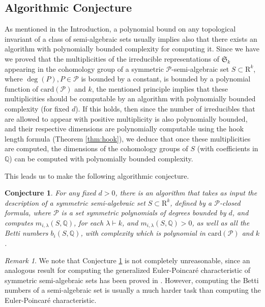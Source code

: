 \documentclass{amsart}
\newtheorem{conjecture}{Conjecture}
\theoremstyle{definition}
\theoremstyle{remark}
\newtheorem{remark}{Remark}
\numberwithin{equation}{section}
\begin{document}
\subsection{Algorithmic Conjecture}
As mentioned in the Introduction, a polynomial bound on any topological invariant
of a class of semi-algebraic sets usually implies also that there exists an algorithm with polynomially bounded
complexity for computing it. 
Since we have we proved that the multiplicities of the irreducible representations of 
$\mathfrak{S}_k$ appearing in the cohomology group  of a symmetric $\mathcal{P}$-semi-algebraic set $S \subset {\mathrm{R}}^k$, where $\deg(P), P \in \mathcal{P}$ is bounded by a constant, is bounded 
by a polynomial function of ${\mathrm{card}}(\mathcal{P})$ and $k$, the mentioned  principle implies that these multiplicities 
should be computable by an algorithm with polynomially bounded complexity (for fixed $d$).
If this holds, then since the number of irreducibles
that are allowed to appear with positive multiplicity is also polynomially bounded, and
their respective dimensions are polynomially computable using the hook length formula (Theorem 
\ref{thm:hook}),
we deduce that once these multiplicities are computed, the dimensions of the cohomology groups of $S$ (with coefficients in ${\mathbb{Q}}$)
can be computed with polynomially bounded complexity. 
 
This leads us to make the following algorithmic conjecture.

\begin{conjecture}
\label{conj:poly}
For any fixed $d >0$, there is an algorithm that takes as input
the description of a symmetric semi-algebraic set $S \subset {\mathrm{R}}^k$,
defined by a $\mathcal{P}$-closed formula, where 
$\mathcal{P}$ is a set symmetric polynomials of degrees bounded by $d$, and computes
$m_{i,\lambda}(S,{\mathbb{Q}})$, for each $\lambda \vdash k$, and  
$m_{i,\lambda}(S,{\mathbb{Q}})>0$, 
as well as all the Betti numbers $b_i(S,{\mathbb{Q}})$, with complexity which is polynomial
in  ${\mathrm{card}}(\mathcal{P})$ and $k$.
\end{conjecture}

\begin{remark}
\label{rem:poly}
We note that Conjecture \ref{conj:poly} is not completely unreasonable, since
an analogous result for computing the generalized Euler-Poincar\'e characteristic
of symmetric semi-algebraic sets has been proved in \cite{BC2013}. However, computing the
Betti numbers of a semi-algebraic set is usually a much harder task than computing the
Euler-Poincar\'e characteristic.
\end{remark}



\end{document}
